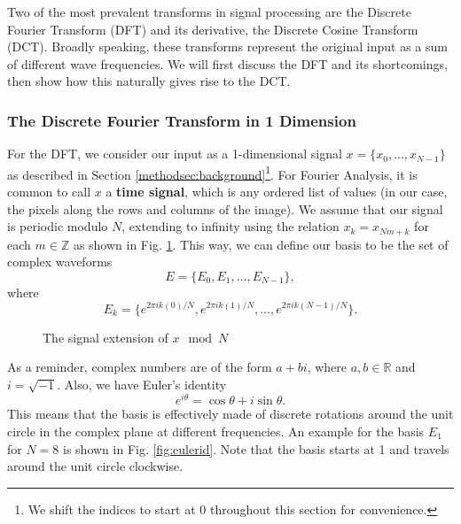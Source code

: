 
Two of the most prevalent transforms in signal processing are the Discrete Fourier Transform (DFT) and its derivative, the Discrete Cosine Transform (DCT). Broadly speaking, these transforms represent the original input as a sum of different wave frequencies. We will first discuss the DFT and its shortcomings, then show how this naturally gives rise to the DCT. 

\subsubsection{The Discrete Fourier Transform in 1 Dimension}

For the DFT, we consider our input as a 1-dimensional signal $x=\{x_0,\dots,x_{N-1}\}$ as described in Section \ref{methodsec:background}\footnote{We shift the indices to start at 0 throughout this section for convenience.}. For Fourier Analysis, it is common to call $x$ a \textbf{time signal}, which is any ordered list of values (in our case, the pixels along the rows and columns of the image). We assume that our signal is periodic modulo $N$, extending to infinity using the relation $x_k=x_{Nm+k}$ for each $m\in\mathbb{Z}$ as shown in Fig. \ref{fig:sigmod}. This way, we can define our basis to be the set of complex waveforms
\begin{equation}
    E=\{E_0,E_1,\dots,E_{N-1}\},\label{eq:dftbasis}
\end{equation}
where
\begin{equation}
    E_k=\{e^{2\pi ik(0)/N}, e^{2\pi ik(1)/N},\dots,e^{2\pi ik(N-1)/N}\}.\label{eq:dftbasiselement}
\end{equation}

\begin{figure}
    \centering
    
    \caption{The signal extension of $x\mod N$}
    \label{fig:sigmod}
\end{figure}

As a reminder, complex numbers are of the form $a+bi$, where $a,b\in\mathbb{R}$ and $i=\sqrt{-1}$. Also, we have Euler's identity
\begin{equation}
    e^{i\theta}=\cos\theta+i\sin\theta.
\end{equation}
This means that the basis is effectively made of discrete rotations around the unit circle in the complex plane at different frequencies. An example for the basis $E_1$ for $N=8$ is shown in Fig. \ref{fig:eulerid}. Note that the basis starts at 1 and travels around the unit circle clockwise.

